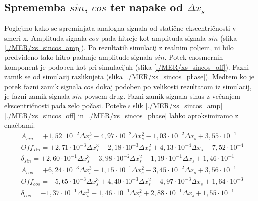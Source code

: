 \subsection{Sprememba $sin$, $cos$ ter napake od $\Delta x_s$}

Poglejmo kako se spreminjata analogna signala od statične ekscentričnosti v smeri x. Amplituda signala $cos$ pada hitreje kot amplituda signala $sin$ (slika \ref{./MER/xs_sincos_amp}). Po rezultatih simulacij z realnim poljem, ni bilo predvideno tako hitro padanje amplitude signala $sin$. Potek enosmernih komponent je podoben kot pri simulacijah (slika \ref{./MER/xs_sincos_off}). Fazni zamik se od simulacij razlikujeta (slika \ref{./MER/xs_sincos_phase}). Medtem ko je potek fazni zamik signala $cos$ dokaj podoben po velikosti rezultatom iz simulacij, je fazni zamik signala $sin$ povsem drug. Fazni zamik signala sinus z večanjem ekscentričnosti pada zelo počasi.
Poteke s slik \ref{./MER/xs_sincos_amp} \ref{./MER/xs_sincos_off} in \ref{./MER/xs_sincos_phase} lahko aproksimiramo z enačbami. 
\begin{eqnarray}
&A_{sin} = +1,52\cdot 10^{-2}\Delta x_s^3-4,97\cdot 10^{-2}\Delta x_s^2-1,03\cdot 10^{-2}\Delta x_s+3,55\cdot 10^{-1}\\     
&Off_{sin} = +2,71\cdot 10^{-3}\Delta x_s^3-2,18\cdot 10^{-3}\Delta x_s^2+4,13\cdot 10^{-4}\Delta x_s-7,52\cdot 10^{-4}\\   
&\delta_{sin} = +2,60\cdot 10^{-1}\Delta x_s^3-3,98\cdot 10^{-2}\Delta x_s^2-1,19\cdot 10^{-1}\Delta x_s+1,46\cdot 10^{-1}\\
&A_{cos} = +6,24\cdot 10^{-3}\Delta x_s^3-1,15\cdot 10^{-1}\Delta x_s^2-3,45\cdot 10^{-2}\Delta x_s+3,56\cdot 10^{-1}\\     
&Off_{cos} = -5,65\cdot 10^{-3}\Delta x_s^3+4,40\cdot 10^{-3}\Delta x_s^2-4,97\cdot 10^{-3}\Delta x_s+1,64\cdot 10^{-3}\\   
&\delta_{cos} = -1,37\cdot 10^{-1}\Delta x_s^3+1,46\cdot 10^{-1}\Delta x_s^2+2,88\cdot 10^{-1}\Delta x_s+1,55\cdot 10^{-1}  
\end{eqnarray}

